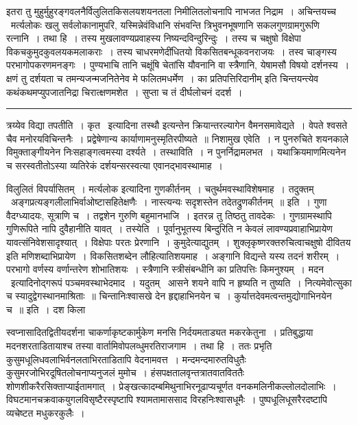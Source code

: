 \documentclass[11pt, openany]{book}
\begin{document}
इतरा तु मुहुर्मुहुरङ्गवलनैर्विलुलितकिसलयशयनतला निमीलितलोचनापि नाभजत निद्राम~। अचिन्तयच्च \textendash\ मर्त्यलोकः खलु सर्वलोकानामुपरि, यस्मिन्नेवंविधानि संभवन्ति त्रिभुवनभूषणानि सकलगुणग्रामगुरूणि रत्नानि~। तथा हि~। तस्य मुखलावण्यप्रवाहस्य निष्यन्दविन्दुरिन्दुः~। तस्य च चक्षुषो विक्षेपा विकचकुमुदकुवलयकमलाकराः~। तस्य चाधरमणेदींधितयो विकसितबन्धूकवनराजयः~। तस्व चाङ्गस्य परभागोपकरणमनङ्गः~। पुण्यभाचि तानि चक्षूंषि चेतांसि यौवनानि वा स्त्रैणानि, येषामसौ विषयो दर्शनस्य~। क्षणं तु दर्शयता च तमन्यजन्मजनितेनेव मे फलितमधर्मेण~। का प्रतिपत्तिरिदानीम् इति चिन्तयन्त्येव कथंकथमप्युपजातनिद्रा चिरात्क्षणमशेत~। सुप्ता च तं दीर्घलोचनं ददर्श~।

\vspace{2mm}
\hrule

\noindent
{\s त्रय्येव विद्या तपतीति~। {\qt कृत \textendash\ }इत्यादिना {\qt तस्थौ} इत्यन्तेन क्रियान्तरल्यागेन वैमनसमावेद्यते~। {\qt वेपते श्वसते चैव मनोरयविचिन्तनैः~। प्रद्वेषेणान्य कार्याणामनुस्मृतिरपीष्यते~॥} {\qtt निशामुख एवेति}~। न पुनरुचिते शयनकाले विमुक्ताङ्गीयनेन निःसहाङ्गत्वमस्या दर्श्यते~। {\qtt तस्थाविति}~। न पुनर्निद्रामलभत~। यथाक्रियमाणमित्यनेन च सरस्वतीतोऽस्या व्यतिरेकं दर्शयन्सरस्वत्या एवानद्भावस्थामाह~।

विलुलितं विपर्यासितम्~। मर्त्यलोक इत्यादिना गुणकीर्तनम्~। चतुर्थमवस्थाविशेषमाह~। तदुक्तम् \textendash\ {\qt अङ्गप्रत्यङ्गलीलाभिर्वाओष्टासहितेक्षणैः~। नास्त्यन्यः सदृशस्तेन तदेतद्रुणकीर्तनम्~॥} इति~। गुणा वैदग्ध्यादयः, सूत्राणि च~। तद्वशेन गुरुणि बहुमानभाजि~। इतरन्न तु तिष्ठतु तावदेकः~। गुणग्रामस्थापि गुणिरूपिते नापि दुवैहानीति यावत्~। {\qtt तस्येति}~। पूर्वानुभूतस्य बिन्दुरिति न केवलं लावण्यप्रवाहाभिप्रायेण यावत्संनिवेशसादृश्यात्~। विक्षेपाः परतः प्रेरणानि~। कुमुदेत्याद्युतम्~। शुक्लृकृष्णरक्तरुचित्वाचक्षुषो दीवितय इति मणिशब्दाभिप्रायेण~। विकसितशब्देन लौहित्यातिशयमाह~। अङ्गानि विद्यन्ते यस्य तदनं शरीरम्~। परभागो वर्णस्य वर्णान्तरेण शोभातिशयः~। स्त्रैणानि स्त्रीसंबन्धीनि का प्रतिपत्तिः किमनुश्यम्~। मदन \textendash\ इत्यादिनोद्गरूपं पञ्चमवस्थाभेदमाद~। यदुतम् \textendash\ {\qt आसने शयने वापि न हृष्यति न तुष्यति~। नित्यमेवोत्सुका च स्यादुद्वेगस्थानमाश्रिताः~॥ चिन्तानिःश्वासखे देन हृद्दाहाभिनयेन च~। कुर्यात्तदेवमत्वन्तमुद्योगाभिनयेन च~॥} इति~। दश किला}

\newpage

\noindent
स्वप्नासादितद्वितीयदर्शना चाकर्णाकृष्टकार्मुकेण मनसि निर्दयमताड्यत मकरकेतुना~। प्रतिबुद्धाया मदनशरताडितायाश्च तस्या वार्तामिवोपलव्धुमरतिराजगाम~। तथा हि~। ततः प्रभृति कुसुमधूलिधवलाभिर्वनलताभिरताडितापि वेदनामवत्त~। मन्दमन्दमारुतविधुतैः कुसुमरजोभिरदूषितलोचनाप्यनुजलं मुमोच~। हंसपक्षतालवृन्तत्रातवातविततैः शोणशीकरैरसिक्ताप्याईतामगात्~। प्रेङ्खत्कादम्बमिथुनाभिरनूढाप्यचूर्णत वनकमलिनीकल्लोलदोलाभिः~। विघटमानचक्रवाकयुगलविसृष्टैरस्पृष्टापि श्यामतामाससाद विरहनिःश्वासधूमैः~। पुष्पधूलिधूसरैरदष्टापि व्यचेष्टत मधुकरकुलैः~।
\end{document}
